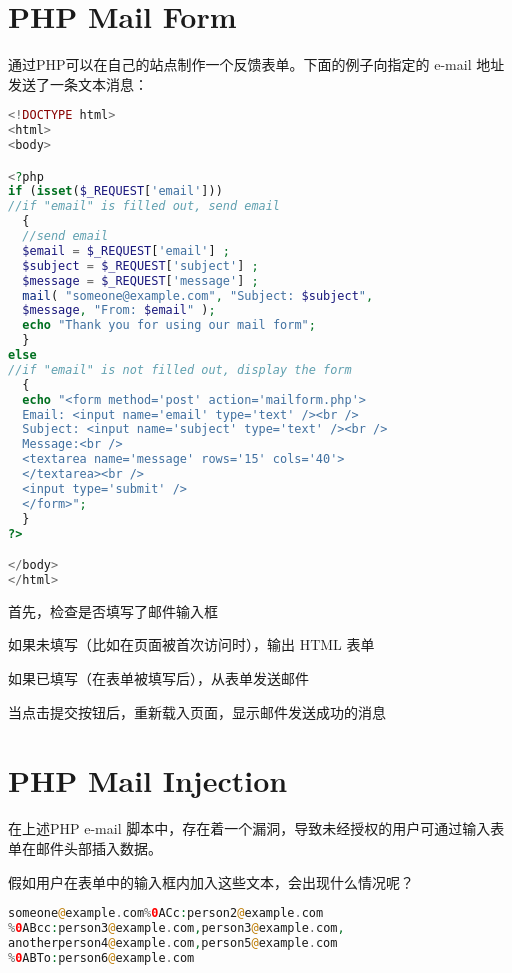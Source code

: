 \section{PHP Mail Form}


通过PHP可以在自己的站点制作一个反馈表单。下面的例子向指定的 e-mail 地址发送了一条文本消息：

\begin{lstlisting}[language=PHP]
<!DOCTYPE html>
<html>
<body>

<?php
if (isset($_REQUEST['email']))
//if "email" is filled out, send email
  {
  //send email
  $email = $_REQUEST['email'] ; 
  $subject = $_REQUEST['subject'] ;
  $message = $_REQUEST['message'] ;
  mail( "someone@example.com", "Subject: $subject",
  $message, "From: $email" );
  echo "Thank you for using our mail form";
  }
else
//if "email" is not filled out, display the form
  {
  echo "<form method='post' action='mailform.php'>
  Email: <input name='email' type='text' /><br />
  Subject: <input name='subject' type='text' /><br />
  Message:<br />
  <textarea name='message' rows='15' cols='40'>
  </textarea><br />
  <input type='submit' />
  </form>";
  }
?>

</body>
</html>
\end{lstlisting}


\begin{compactenum}
\item 首先，检查是否填写了邮件输入框
\item 如果未填写（比如在页面被首次访问时），输出 HTML 表单
\item 如果已填写（在表单被填写后），从表单发送邮件
\item 当点击提交按钮后，重新载入页面，显示邮件发送成功的消息
\end{compactenum}




\section{PHP Mail Injection}

在上述PHP e-mail 脚本中，存在着一个漏洞，导致未经授权的用户可通过输入表单在邮件头部插入数据。

假如用户在表单中的输入框内加入这些文本，会出现什么情况呢？

\begin{lstlisting}[language=PHP]
someone@example.com%0ACc:person2@example.com
%0ABcc:person3@example.com,person3@example.com,
anotherperson4@example.com,person5@example.com
%0ABTo:person6@example.com
\end{lstlisting}

